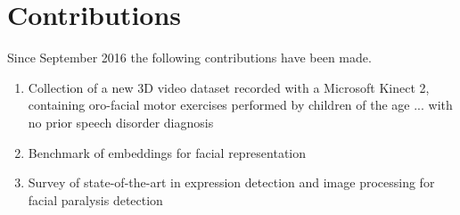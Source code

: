 \begin{comment}
Considering clinical medical data existing in the Electronic Health Records, in particular, multimodal time series of data from health sensors and medical notes collected at each patient visit, we wish to recognize health/clinical patterns to support health professionals in their decisions through (i) suggestions and (ii) similar examples.
\end{comment}

\section{Contributions}

Since September 2016 the following contributions have been made.
\begin{enumerate}
\item Collection of a new 3D video dataset recorded with a Microsoft Kinect 2,  containing oro-facial motor exercises performed by children of the age ... with no prior speech disorder diagnosis 
\item Benchmark of embeddings for facial representation
\item Survey of state-of-the-art in expression detection and image processing for facial paralysis detection
\end{enumerate} 



